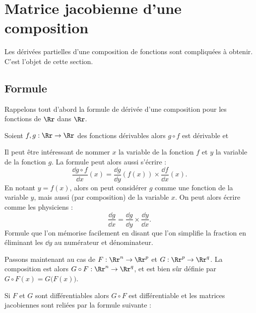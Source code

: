 \documentclass[12pt, class=report,crop=false]{standalone}
\begin{document}
\section{Matrice jacobienne d'une composition}


Les dérivées partielles d'une composition de fonctions sont compliquées à obtenir. C'est l'objet de cette section.

\subsection{Formule}

Rappelons tout d'abord la formule de dérivée d'une composition pour les fonctions de $\Rr$ dans $\Rr$.

\begin{proposition}
Soient $f,g : \Rr \to \Rr$ des fonctions dérivables alors $g \circ f$ est dérivable et 
\end{proposition}





\begin{remarque*}
Il peut être intéressant de nommer $x$ la variable de la fonction $f$ et $y$ la variable de la fonction $g$. La formule peut alors aussi s'écrire :
$$
\frac{\dd g \circ f}{\dd x}(x) = \frac{\dd g}{\dd y}(f(x)) \times \frac{\dd f}{\dd x}(x).$$
En notant $y=f(x)$, alors on peut considérer $g$ comme une fonction de la variable $y$, mais aussi (par composition) de la variable $x$. On peut alors écrire comme les physiciens :
$$\frac{\dd g}{\dd x} = \frac{\dd g}{\dd y} \times \frac{\dd y}{\dd x}.$$
Formule que l'on mémorise facilement en disant que l'on simplifie la fraction en éliminant les $\dd y$ au numérateur et dénominateur.
\end{remarque*}

\bigskip

Passons maintenant au cas de $F : \Rr^n \to \Rr^p$ et $G : \Rr^p \to \Rr^q$. La composition est alors $G \circ F : \Rr^n \to \Rr^q$, et est bien sûr définie par $G \circ F(x) = G \big( F(x) \big)$.


\begin{theoreme}
Si $F$ et $G$ sont différentiables alors $G \circ F$ est différentiable et
les matrices jacobiennes sont reliées par la formule suivante :
\end{theoreme}
\end{document}
